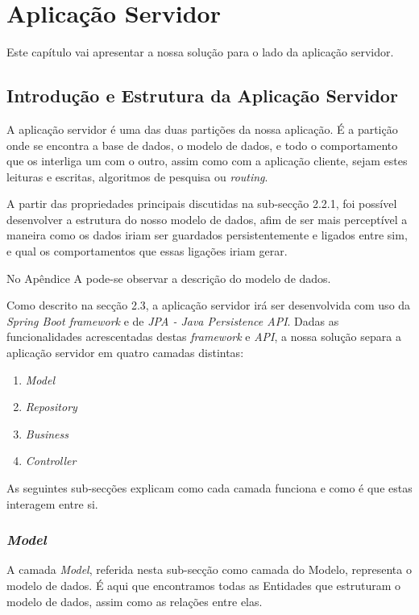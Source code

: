 %
\chapter{Aplicação Servidor} \label{cap:exemplos}

Este capítulo vai apresentar a nossa solução para o lado da aplicação servidor.

\section{Introdução e Estrutura da Aplicação Servidor} \label{sec31}
A aplicação servidor é uma das duas partições da nossa aplicação. É a partição onde se encontra a base de dados, o modelo de dados, e todo o comportamento que os interliga um com o outro, assim como com a aplicação cliente, sejam estes leituras e escritas, algoritmos de pesquisa ou \emph{routing}.

A partir das propriedades principais discutidas na sub-secção 2.2.1, foi possível desenvolver a estrutura do nosso modelo de dados, afim de ser mais perceptível a maneira como os dados iriam ser guardados persistentemente e ligados entre sim, e qual os comportamentos que essas ligações iriam gerar. 

No Apêndice A pode-se observar a descrição do modelo de dados.

Como descrito na secção 2.3, a aplicação servidor irá ser desenvolvida com uso da \emph{Spring Boot framework} e de 
\emph{JPA - Java Persistence API}. Dadas as funcionalidades acrescentadas destas \emph{framework} e \emph{API}, a nossa solução separa a aplicação servidor em quatro camadas distintas:
\begin{enumerate}
	\item \emph{Model}
	\item \emph{Repository}
	\item \emph{Business}
	\item \emph{Controller}
\end{enumerate}
As seguintes sub-secções explicam como cada camada funciona e como é que estas interagem entre si.

\subsection{\emph{Model}} \label{sec311}
A camada \emph{Model}, referida nesta sub-secção como camada do Modelo, representa o modelo de dados. É aqui que encontramos todas as Entidades que estruturam o modelo de dados, assim como as relações entre elas. 


